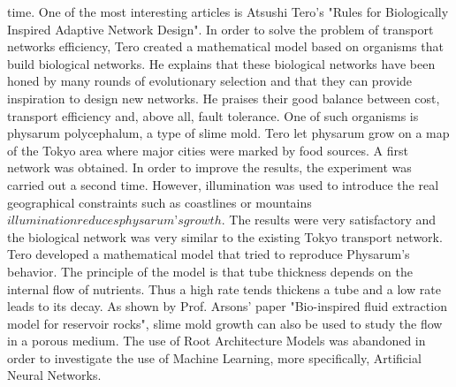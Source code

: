 time.
One of the most interesting articles is Atsushi Tero’s "Rules for Biologically Inspired
Adaptive Network Design". In order to solve the problem of transport networks efficiency,
Tero created a mathematical model based on organisms that build biological networks. He
explains that these biological networks have been honed by many rounds of evolutionary
selection and that they can provide inspiration to design new networks. He praises their
good balance between cost, transport efficiency and, above all, fault tolerance. One of
such organisms is physarum polycephalum, a type of slime mold. Tero let physarum
grow on a map of the Tokyo area where major cities were marked by food sources. A
first network was obtained. In order to improve the results, the experiment was carried
out a second time. However, illumination was used to introduce the real geographical
constraints such as coastlines or mountains \(illumination reduces physarum’s growth\). The
results were very satisfactory and the biological network was very similar to the existing
Tokyo transport network. Tero developed a mathematical model that tried to reproduce
Physarum’s behavior. The principle of the model is that tube thickness depends on the
internal flow of nutrients. Thus a high rate tends thickens a tube and a low rate leads
to its decay. As shown by Prof. Arsons’ paper "Bio-inspired fluid extraction model for
reservoir rocks", slime mold growth can also be used to study the flow in a porous medium.
The use of Root Architecture Models was abandoned in order to investigate the use of Machine Learning, more specifically, Artificial Neural Networks.


